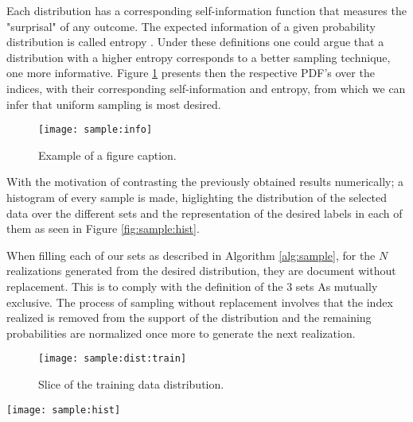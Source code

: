 \documentclass[conference]{IEEEtran}
\begin{document}
Each distribution has a corresponding self-information function that measures
the "surprisal" of any outcome. The expected information of a given probability
distribution is called entropy \cite{information:borda}. Under these definitions
one could argue that a distribution with a higher entropy corresponds to a
better sampling technique, one more informative. Figure \ref{fig:sample:info}
presents then the respective PDF's over the indices, with their corresponding
self-information and entropy, from which we can infer that uniform sampling is
most desired.


\begin{figure}[h]
    \texttt{[image: sample:info]}
    \caption{Example of a figure caption. \label{fig:sample:info}}
\end{figure}

With the motivation of contrasting the previously obtained results numerically;
a histogram of every sample is made, higlighting the distribution of the selected
data over the different sets and the representation of the desired labels in each
of them as seen in Figure \ref{fig:sample:hist}. 


When filling each of our sets as described in Algorithm \ref{alg:sample}, 
for the $N$ realizations generated from the desired distribution, they are document
without replacement. This is to comply with the definition of the $3$ sets As
mutually exclusive. The process of sampling without replacement involves
that the index realized is removed from the support of the distribution and the
remaining probabilities are normalized once more to generate the next realization.


\begin{figure}[h]
    \texttt{[image: sample:dist:train]}
    \caption{Slice of the training data distribution. \label{fig:sample:dist:train}}
\end{figure}

\begin{figure*}[h]
    \texttt{[image: sample:hist]}
    \caption{Example of a figure caption. \label{fig:sample:hist}}
\end{figure*}


\printbibliography
\end{document}
